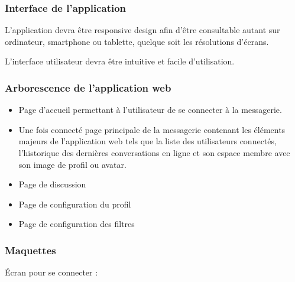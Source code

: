 \subsubsection{Interface de l’application}

\par L’application devra être responsive design afin d’être consultable autant sur ordinateur, smartphone ou tablette, quelque soit les résolutions d’écrans. 

\par L’interface utilisateur devra être intuitive et facile d’utilisation. 

\subsubsection{Arborescence de l’application web}

\begin{itemize}
	\item Page d'accueil permettant à l’utilisateur de se connecter à la messagerie.	
	\item Une fois connecté page principale de la messagerie contenant les éléments majeurs de l'application web tels que la liste des utilisateurs connectés, l’historique des dernières conversations en ligne et son espace membre avec son image de profil ou avatar.
	\item Page de discussion 
	\item Page de configuration du profil
	\item Page de configuration des filtres
\end{itemize}

\subsubsection{Maquettes}

Écran pour se connecter : 

